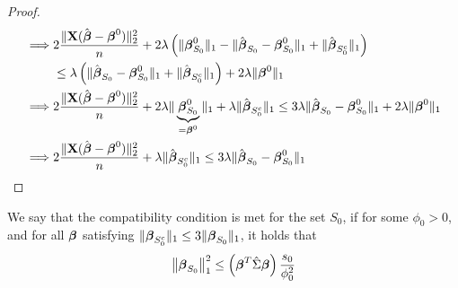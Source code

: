 \begin{proof}
\begin{align*}
        \implies & 2 \frac{\| \mathbf{X} (\hat{\boldsymbol{\beta}}-\boldsymbol{\beta}^{0})\|_{2}^{2}}{n} + 2 \lambda \left( \|\boldsymbol{\beta}_{S_{0}}^{0} \|_{1} - \|\hat{\boldsymbol{\beta}}_{S_{0}}-\boldsymbol{\beta}_{S_{0}}^{0} \|_{1}+ \|\hat{\boldsymbol{\beta}}_{S_{0}^{c}} \|_{1} \right)                                                               \\
                 & \leq \lambda \left( \| \hat{\boldsymbol{\beta}}_{S_{0}}-\boldsymbol{\beta}_{S_{0}}^{0} \|_{1} + \|\hat{\boldsymbol{\beta}}_{S_{0}^{c}} \|_{1} \right) + 2 \lambda \|\boldsymbol{\beta}^{0} \|_{1}                                                                                                            \\
        \implies & 2 \frac{\| \mathbf{X} (\hat{\boldsymbol{\beta}}-\boldsymbol{\beta}^{0})\|_{2}^{2}}{n} + 2 \lambda \|\underbrace{\boldsymbol{\beta}_{S_{0}}^{0}}_{= \boldsymbol{\beta}^0} \|_{1} + \lambda \|\hat{\boldsymbol{\beta}}_{S_{0}^{c}} \|_{1} \leq 3 \lambda \| \hat{\boldsymbol{\beta}}_{S_{0}}-\boldsymbol{\beta}_{S_{0}}^{0} \|_{1} + 2 \lambda \|\boldsymbol{\beta}^{0} \|_{1} \\
        \implies & 2\frac{ \|\mathbf{X} (\hat{\boldsymbol{\beta}}-\boldsymbol{\beta}^{0} ) \|_{2}^{2}}{n} + \lambda \|\hat{\boldsymbol{\beta}}_{S_{0}^{c}} \|_{1} \leq 3 \lambda \|\hat{\boldsymbol{\beta}}_{S_{0}}-\boldsymbol{\beta}_{S_{0}}^{0} \|_{1}
    \end{align*}
\end{proof}

\begin{definition}
    We say that the compatibility condition is met for the set $S_{0}$, if for some $\phi_{0}>0$, and for all $\boldsymbol{\beta}$ satisfying $ \|\boldsymbol{\beta}_{S_{0}^{c}} \|_{1} \leq 3 \|\boldsymbol{\beta}_{S_{0}} \|_{1}$, it holds that
    \begin{equation}
        \left\| \boldsymbol{\beta}_{S_{0}} \right\|_{1}^{2} \leq \left(\boldsymbol{\beta}^{T} \hat{\Sigma} \boldsymbol{\beta}\right) \frac{s_{0}}{\phi_{0}^{2}}
    \end{equation}
\end{definition}

